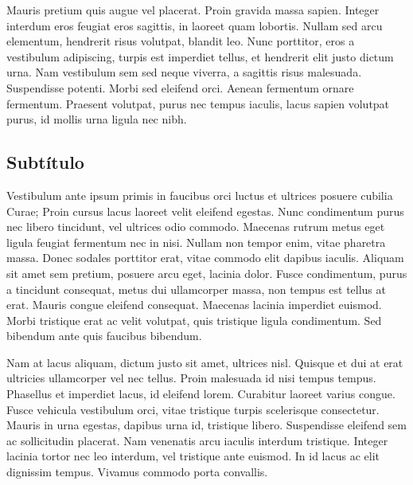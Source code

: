 \documentclass[11pt,letterpaper]{article}
\begin{document}
Mauris pretium quis augue vel placerat. Proin gravida massa sapien. Integer interdum eros feugiat eros sagittis, in laoreet quam lobortis. Nullam sed arcu elementum, hendrerit risus volutpat, blandit leo. Nunc porttitor, eros a vestibulum adipiscing, turpis est imperdiet tellus, et hendrerit elit justo dictum urna. Nam vestibulum sem sed neque viverra, a sagittis risus malesuada. Suspendisse potenti. Morbi sed eleifend orci. Aenean fermentum ornare fermentum. Praesent volutpat, purus nec tempus iaculis, lacus sapien volutpat purus, id mollis urna ligula nec nibh.

\subsection{Subtítulo}


\begin{multicols}{2}
Vestibulum ante ipsum primis in faucibus orci luctus et ultrices posuere cubilia Curae; Proin cursus lacus laoreet velit eleifend egestas. Nunc condimentum purus nec libero tincidunt, vel ultrices odio commodo. Maecenas rutrum metus eget ligula feugiat fermentum nec in nisi. Nullam non tempor enim, vitae pharetra massa. Donec sodales porttitor erat, vitae commodo elit dapibus iaculis. Aliquam sit amet sem pretium, posuere arcu eget, lacinia dolor. Fusce condimentum, purus a tincidunt consequat, metus dui ullamcorper massa, non tempus est tellus at erat. Mauris congue eleifend consequat. Maecenas lacinia imperdiet euismod. Morbi tristique erat ac velit volutpat, quis tristique ligula condimentum. Sed bibendum ante quis faucibus bibendum.

Nam at lacus aliquam, dictum justo sit amet, ultrices nisl. Quisque et dui at erat ultricies ullamcorper vel nec tellus. Proin malesuada id nisi tempus tempus. Phasellus et imperdiet lacus, id eleifend lorem. Curabitur laoreet varius congue. Fusce vehicula vestibulum orci, vitae tristique turpis scelerisque consectetur. Mauris in urna egestas, dapibus urna id, tristique libero. Suspendisse eleifend sem ac sollicitudin placerat. Nam venenatis arcu iaculis interdum tristique. Integer lacinia tortor nec leo interdum, vel tristique ante euismod. In id lacus ac elit dignissim tempus. Vivamus commodo porta convallis.
\end{multicols}
\end{document}
